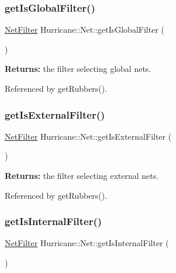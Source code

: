 \subsubsection{\texorpdfstring{get\+Is\+Global\+Filter()}{getIsGlobalFilter()}}
{\footnotesize\ttfamily \hyperlink{namespaceHurricane_a0dfd2c5b40325a919d139091312732e9}{Net\+Filter} Hurricane\+::\+Net\+::get\+Is\+Global\+Filter (\begin{DoxyParamCaption}{ }\end{DoxyParamCaption})\hspace{0.3cm}{\ttfamily [static]}}

{\bfseries Returns\+:} the filter selecting global nets. 

Referenced by get\+Rubbers().

\mbox{\label{classHurricane_1_1Net_a3af91a80e219e37e70229e61dfd385da}} 
\subsubsection{\texorpdfstring{get\+Is\+External\+Filter()}{getIsExternalFilter()}}
{\footnotesize\ttfamily \hyperlink{namespaceHurricane_a0dfd2c5b40325a919d139091312732e9}{Net\+Filter} Hurricane\+::\+Net\+::get\+Is\+External\+Filter (\begin{DoxyParamCaption}{ }\end{DoxyParamCaption})\hspace{0.3cm}{\ttfamily [static]}}

{\bfseries Returns\+:} the filter selecting external nets. 

Referenced by get\+Rubbers().

\mbox{\label{classHurricane_1_1Net_a7a2d1c4ab84bf81a16e24557d2342ea5}} 
\subsubsection{\texorpdfstring{get\+Is\+Internal\+Filter()}{getIsInternalFilter()}}
{\footnotesize\ttfamily \hyperlink{namespaceHurricane_a0dfd2c5b40325a919d139091312732e9}{Net\+Filter} Hurricane\+::\+Net\+::get\+Is\+Internal\+Filter (\begin{DoxyParamCaption}{ }\end{DoxyParamCaption})\hspace{0.3cm}{\ttfamily [static]}}

